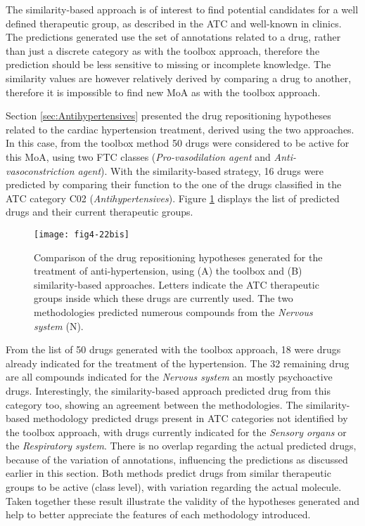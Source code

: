 The similarity-based approach is of interest to find potential candidates for a well defined therapeutic group, as described in the ATC and well-known in clinics. The predictions generated use the set of annotations related to a drug, rather than just a discrete category as with the toolbox approach, therefore the prediction should be less sensitive to missing or incomplete knowledge. The similarity values are however relatively derived by comparing a drug to another, therefore it is impossible to find new MoA as with the toolbox approach.

Section \ref{sec:Antihypertensives} presented the drug repositioning hypotheses related to the cardiac hypertension treatment, derived using the two approaches. In this case, from the toolbox method 50 drugs were considered to be active for this MoA, using two FTC classes (\emph{Pro-vasodilation agent} and \emph{Anti-vasoconstriction agent}). With the similarity-based strategy, 16 drugs were predicted by comparing their function to the one of the drugs classified in the ATC category C02 (\emph{Antihypertensives}). Figure \ref{fig4-22bis} displays the list of predicted drugs and their current therapeutic groups.

\begin{figure}[H]
    \centering
    \texttt{[image: fig4-22bis]}
    \caption{Comparison of the drug repositioning hypotheses generated for the treatment of anti-hypertension, using (A) the toolbox and (B) similarity-based approaches. Letters indicate the ATC therapeutic groups inside which these drugs are currently used. The two methodologies predicted numerous compounds from the \emph{Nervous system} (N).}
    \label{fig4-22bis}
\end{figure}

From the list of 50 drugs generated with the toolbox approach, 18 were drugs already indicated for the treatment of the hypertension. The 32 remaining drug are all compounds indicated for the \emph{Nervous system} an mostly psychoactive drugs. Interestingly, the similarity-based approach predicted drug from this category too, showing an agreement between the methodologies. The similarity-based methodology predicted drugs present in ATC categories not identified by the toolbox approach, with drugs currently indicated for the \emph{Sensory organs} or the \emph{Respiratory system}. There is no overlap regarding the actual predicted drugs, because of the variation of annotations, influencing the predictions as discussed earlier in this section. Both methods predict drugs from similar therapeutic groups to be active (class level), with variation regarding the actual molecule. Taken together these result illustrate the validity of the hypotheses generated and help to better appreciate the features of each methodology introduced.

